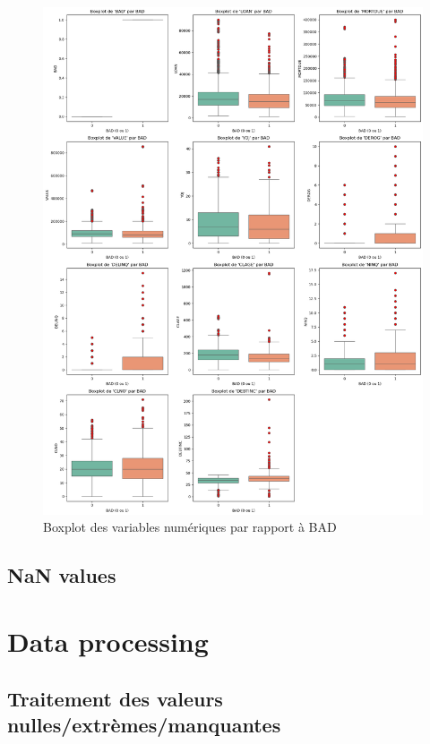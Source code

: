 \documentclass[a4paper,12pt]{report}
\begin{document}
\begin{figure}[h!]
  \includegraphics[width=\textwidth]{boxplot_var_num}
  \caption{Boxplot des variables numériques par rapport à BAD}
  \label{fig:boxplot_var_num}
\end{figure}

\section{NaN values}



\chapter{Data processing}

\section{Traitement des valeurs nulles/extrèmes/manquantes}
\end{document}
